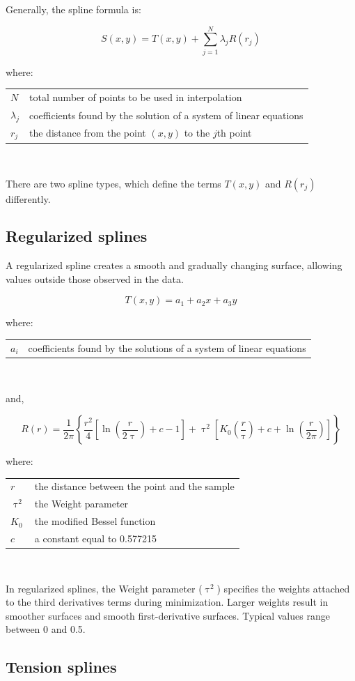 \documentclass{article}
\makeatletter
\newenvironment{conditions}[1][where:] 
  {#1 \begin{tabular}[t]{>{$}l<{$} @{${}={}$} l}}
  {\end{tabular}\\[\belowdisplayskip]}
\makeatother
\begin{document}
Generally, the spline formula is:

\[S(x, y) = T(x, y) + \sum_{j=1}^{N} \lambda_{j} R(r_{j})\]

\begin{conditions}
    N & total number of points to be used in interpolation \\
    \lambda_{j} & coefficients found by the solution of a system of linear equations \\
    r_{j} & the distance from the point $(x,y)$ to the $j$th point
\end{conditions}

There are two spline types, which define the terms $T(x, y)$ and $R(r_{j})$ differently.

\subsection{Regularized splines}

A regularized spline creates a smooth and gradually changing surface, allowing values outside those observed in the data.

\[T(x, y) = a_{1} + a_{2}x + a_{3}y\]

\begin{conditions}
    a_{i} & coefficients found by the solutions of a system of linear equations
\end{conditions}

and, 

\[R(r) = \frac{1}{2 \pi} \left\{\frac{r^2}{4}\left[\ln \left(\frac{r}{2 \uptau}\right) + c - 1 \right] + \uptau^2\left[K_0 \left(\frac{r}{\uptau}\right) + c + \ln \left(\frac{r}{2 \pi}\right)\right]\right\}\]

\begin{conditions}
    r & the distance between the point and the sample \\
    \uptau^2 & the Weight parameter \\
    K_0 & the modified Bessel function \\
    c & a constant equal to 0.577215
\end{conditions}

In regularized splines, the Weight parameter ($\uptau^2$) specifies the weights attached to the third derivatives terms during minimization.
Larger weights result in smoother surfaces and smooth first-derivative surfaces.
Typical values range between 0 and 0.5.

\subsection{Tension splines}
\end{document}

